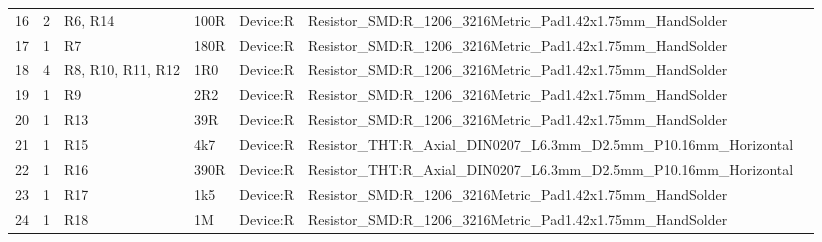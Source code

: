 \documentclass[letterpaper,twocolumn,11pt]{article}
\begin{document}
\begin{sidewaystable*}[ht]
{\begin{tabular}{cclllll}
      16                     & 2                                                        & R6, R14                & 100R                   & Device:R                         & Resistor\_SMD:R\_1206\_3216Metric\_Pad1.42x1.75mm\_HandSolder                                           \\
      17                     & 1                                                        & R7                     & 180R                   & Device:R                         & Resistor\_SMD:R\_1206\_3216Metric\_Pad1.42x1.75mm\_HandSolder                                           \\
      18                     & 4                                                        & R8, R10, R11, R12      & 1R0                    & Device:R                         & Resistor\_SMD:R\_1206\_3216Metric\_Pad1.42x1.75mm\_HandSolder                                           \\
      19                     & 1                                                        & R9                     & 2R2                    & Device:R                         & Resistor\_SMD:R\_1206\_3216Metric\_Pad1.42x1.75mm\_HandSolder                                           \\
      20                     & 1                                                        & R13                    & 39R                    & Device:R                         & Resistor\_SMD:R\_1206\_3216Metric\_Pad1.42x1.75mm\_HandSolder                                           \\
      21                     & 1                                                        & R15                    & 4k7                    & Device:R                         & Resistor\_THT:R\_Axial\_DIN0207\_L6.3mm\_D2.5mm\_P10.16mm\_Horizontal                                   \\
      22                     & 1                                                        & R16                    & 390R                   & Device:R                         & Resistor\_THT:R\_Axial\_DIN0207\_L6.3mm\_D2.5mm\_P10.16mm\_Horizontal                                   \\
      23                     & 1                                                        & R17                    & 1k5                    & Device:R                         & Resistor\_SMD:R\_1206\_3216Metric\_Pad1.42x1.75mm\_HandSolder                                           \\
      24                     & 1                                                        & R18                    & 1M                     & Device:R                         & Resistor\_SMD:R\_1206\_3216Metric\_Pad1.42x1.75mm\_HandSolder                                           \\

\end{tabular}}
\end{sidewaystable*}
\end{document}
